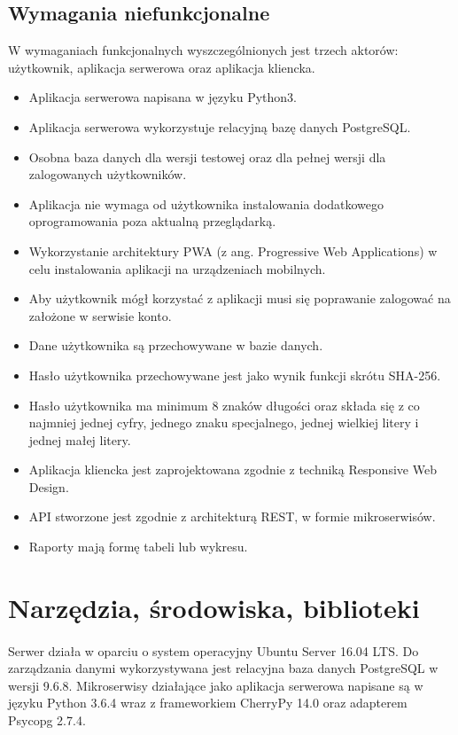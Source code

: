 \documentclass{article}
\begin{document}
	\subsection{Wymagania niefunkcjonalne}
	W wymaganiach funkcjonalnych wyszczególnionych jest trzech aktorów: użytkownik, aplikacja serwerowa oraz aplikacja kliencka.
	\begin{itemize}
		\item Aplikacja serwerowa napisana w języku Python3.
		\item Aplikacja serwerowa wykorzystuje relacyjną bazę danych PostgreSQL.
		\item Osobna baza danych dla wersji testowej oraz dla pełnej wersji dla zalogowanych użytkowników.
		\item Aplikacja nie wymaga od użytkownika instalowania dodatkowego oprogramowania poza aktualną przeglądarką.
		\item Wykorzystanie architektury PWA (z ang. Progressive Web Applications) w celu instalowania aplikacji na urządzeniach mobilnych.
		\item Aby użytkownik mógł korzystać z aplikacji musi się poprawanie zalogować na założone w serwisie konto.
		\item Dane użytkownika są przechowywane w bazie danych.
		\item Hasło użytkownika przechowywane jest jako wynik funkcji skrótu SHA-256.
		\item Hasło użytkownika ma minimum 8 znaków długości oraz składa się z co najmniej jednej cyfry, jednego znaku specjalnego, jednej wielkiej litery i jednej małej litery.
		\item Aplikacja kliencka jest zaprojektowana zgodnie z techniką Responsive Web Design.
		\item API stworzone jest zgodnie z architekturą REST, w formie mikroserwisów.
		\item Raporty mają formę tabeli lub wykresu.
	\end{itemize}
	\section{Narzędzia, środowiska, biblioteki}
	\paragraph{}Serwer działa w oparciu o system operacyjny Ubuntu Server 16.04 LTS.
	Do zarządzania danymi wykorzystywana jest relacyjna baza danych PostgreSQL w wersji 9.6.8.
	Mikroserwisy działające jako aplikacja serwerowa napisane są w języku Python 3.6.4 wraz z frameworkiem CherryPy 14.0 oraz adapterem Psycopg 2.7.4. 
\end{document}
